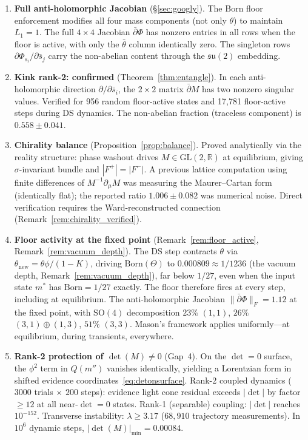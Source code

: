 \documentclass[11pt,a4paper]{article}
\theoremstyle{definition}
\theoremstyle{remark}
\newcommand{\R}{\mathbb{R}}
\newcommand{\dbar}{\bar{\partial}}
\newcommand{\GL}{\mathrm{GL}}
\newcommand{\su}{\mathfrak{su}}
\begin{document}
\begin{enumerate}[nosep]
\item \textbf{Full anti-holomorphic Jacobian} (\S\ref{sec:googly}). The Born floor enforcement modifies all four mass components (not only $\theta$) to maintain $L_1=1$. The full $4\times 4$ Jacobian $\dbar\Phi$ has nonzero entries in all rows when the floor is active, with only the $\bar{\theta}$ column identically zero. The singleton rows $\partial\Phi_{s_i}/\partial\bar{s}_j$ carry the non-abelian content through the $\su(2)$ embedding.

\item \textbf{Kink rank-2: confirmed} (Theorem~\ref{thm:entangle}). In each anti-holomorphic direction $\partial/\partial\bar{s}_i$, the $2\times 2$ matrix $\dbar M$ has two nonzero singular values. Verified for 956 random floor-active states and 17,781 floor-active steps during DS dynamics. The non-abelian fraction (traceless component) is $0.558\pm 0.041$.

\item \textbf{Chirality balance} (Proposition~\ref{prop:balance}). Proved analytically via the reality structure: phase washout drives $M\in\GL(2,\R)$ at equilibrium, giving $\sigma$-invariant bundle and $|F^+|=|F^-|$. A previous lattice computation using finite differences of $M^{-1}\partial_\mu M$ was measuring the Maurer--Cartan form (identically flat); the reported ratio $1.006\pm 0.082$ was numerical noise. Direct verification requires the Ward-reconstructed connection (Remark~\ref{rem:chirality_verified}).

\item \textbf{Floor activity at the fixed point} (Remark~\ref{rem:floor_active}, Remark~\ref{rem:vacuum_depth}). The DS step contracts $\theta$ via $\theta_{\mathrm{new}}=\theta\phi/(1-K)$, driving $\mathrm{Born}(\Theta)$ to $0.000809\approx 1/1236$ (the vacuum depth, Remark~\ref{rem:vacuum_depth}), far below $1/27$, even when the input state $m^*$ has $\mathrm{Born}=1/27$ exactly. The floor therefore fires at every step, including at equilibrium. The anti-holomorphic Jacobian $\|\dbar\Phi\|_F=1.12$ at the fixed point, with $\mathrm{SO}(4)$ decomposition $23\%$ $(1,1)$, $26\%$ $(3,1)\oplus(1,3)$, $51\%$ $(3,3)$. Mason's framework applies uniformly---at equilibrium, during transients, everywhere.

\item \textbf{Rank-2 protection of $\det(M)\neq 0$} (Gap~4). On the $\det=0$ surface, the $\phi^2$ term in $Q(m'')$ vanishes identically, yielding a Lorentzian form in shifted evidence coordinates~\eqref{eq:detonsurface}. Rank-2 coupled dynamics ($3000$ trials $\times$ $200$ steps): evidence light cone residual exceeds $|\det|$ by factor $\geq 12$ at all near-$\det=0$ states. Rank-1 (separable) coupling: $|\det|$ reaches $10^{-152}$. Transverse instability: $\lambda\geq 3.17$ ($68{,}910$ trajectory measurements). In $10^6$ dynamic steps, $|\det(M)|_{\min}=0.00084$.


\end{enumerate}
\end{document}
